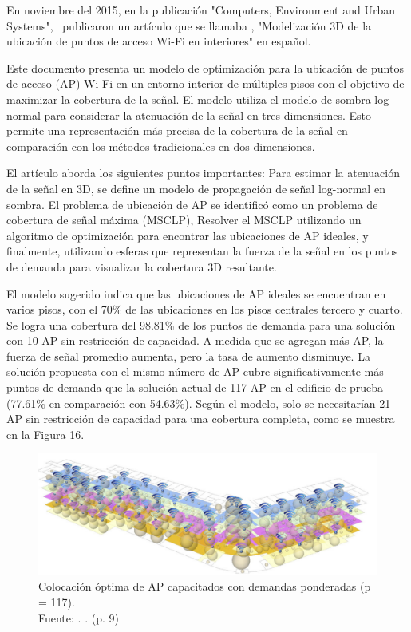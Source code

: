 \newpage
En noviembre del 2015, en la publicación "Computers, Environment and Urban Systems", \cite{pr_lee2015coverage3d} publicaron un artículo que se llamaba , "Modelización 3D de la ubicación de puntos de acceso Wi-Fi en interiores" en español.

Este documento presenta un modelo de optimización para la ubicación de puntos de acceso (AP) Wi-Fi en un entorno interior de múltiples pisos con el objetivo de maximizar la cobertura de la señal. El modelo utiliza el modelo de sombra log-normal para considerar la atenuación de la señal en tres dimensiones. Esto permite una representación más precisa de la cobertura de la señal en comparación con los métodos tradicionales en dos dimensiones.

El artículo aborda los siguientes puntos importantes: Para estimar la atenuación de la señal en 3D, se define un modelo de propagación de señal log-normal en sombra. El problema de ubicación de AP se identificó como un problema de cobertura de señal máxima (MSCLP), Resolver el MSCLP utilizando un algoritmo de optimización para encontrar las ubicaciones de AP ideales, y finalmente, utilizando esferas que representan la fuerza de la señal en los puntos de demanda para visualizar la cobertura 3D resultante.

El modelo sugerido indica que las ubicaciones de AP ideales se encuentran en varios pisos, con el 70\% de las ubicaciones en los pisos centrales tercero y cuarto. Se logra una cobertura del 98.81\% de los puntos de demanda para una solución con 10 AP sin restricción de capacidad. A medida que se agregan más AP, la fuerza de señal promedio aumenta, pero la tasa de aumento disminuye. La solución propuesta con el mismo número de AP cubre significativamente más puntos de demanda que la solución actual de 117 AP en el edificio de prueba (77.61\% en comparación con 54.63\%). Según el modelo, solo se necesitarían 21 AP sin restricción de capacidad para una cobertura completa, como se muestra en la Figura 16.

\begin{figure}[!ht]
	\begin{center}
		\includegraphics[width=1\textwidth]{2/figures/lee2015.png}
		\caption[Colocación óptima de AP capacitados con demandas ponderadas (p = 117)]{Colocación óptima de AP capacitados con demandas ponderadas (p = 117).\\
		Fuente: \cite{pr_lee2015coverage3d}. . (p. 9)}
		\label{2:fig124}
	\end{center}
\end{figure}

